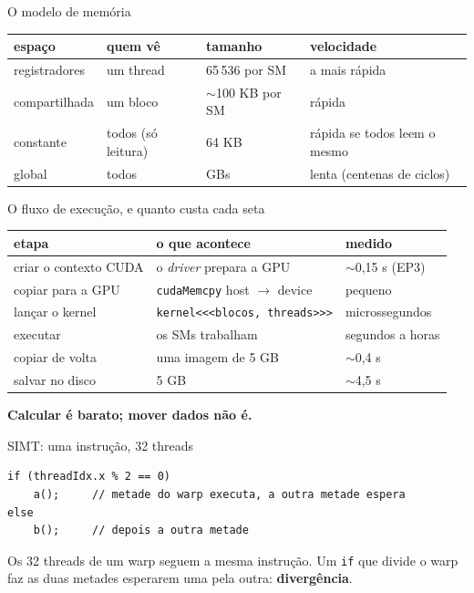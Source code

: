 \documentclass[aspectratio=169,11pt]{beamer}
\begin{document}
\begin{frame}{O modelo de memória}
  \centering\small
  \begin{tabular}{llll}
    \toprule
    espaço & quem vê & tamanho & velocidade \\
    \midrule
    registradores & um thread & 65\,536 por SM & a mais rápida \\
    compartilhada & um bloco & $\sim$100 KB por SM & rápida \\
    constante & todos (só leitura) & 64 KB & rápida se todos leem o mesmo \\
    global & todos & GBs & lenta (centenas de ciclos) \\
    \bottomrule
  \end{tabular}
\end{frame}

\begin{frame}{O fluxo de execução, e quanto custa cada seta}
  \centering
  \begin{tabular}{lll}
    \toprule
    etapa & o que acontece & medido \\
    \midrule
    criar o contexto CUDA & o \emph{driver} prepara a GPU & $\sim$0,15 s (EP3) \\
    copiar para a GPU & \texttt{cudaMemcpy} host $\to$ device & pequeno \\
    lançar o kernel & \texttt{kernel<<<blocos, threads>>>} & microssegundos \\
    executar & os SMs trabalham & segundos a horas \\
    copiar de volta & uma imagem de 5 GB & $\sim$0,4 s \\
    salvar no disco & 5 GB & $\sim$4,5 s \\
    \bottomrule
  \end{tabular}
  \vfill
  \textbf{Calcular é barato; mover dados não é.}
\end{frame}

\begin{frame}[fragile]{SIMT: uma instrução, 32 threads}
  \begin{lstlisting}
if (threadIdx.x % 2 == 0)
    a();     // metade do warp executa, a outra metade espera
else
    b();     // depois a outra metade
  \end{lstlisting}
  \vfill
  Os 32 threads de um warp seguem a mesma instrução. Um \texttt{if} que divide o warp faz as duas metades esperarem uma pela outra: \textbf{divergência}.
\end{frame}
\end{document}
